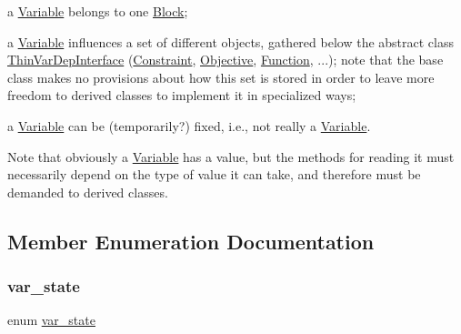 \begin{DoxyItemize}
\item a \mbox{\hyperlink{class_s_m_spp__di__unipi__it_1_1_variable}{Variable}} belongs to one \mbox{\hyperlink{class_s_m_spp__di__unipi__it_1_1_block}{Block}};
\item a \mbox{\hyperlink{class_s_m_spp__di__unipi__it_1_1_variable}{Variable}} influences a set of different objects, gathered below the abstract class \mbox{\hyperlink{class_s_m_spp__di__unipi__it_1_1_thin_var_dep_interface}{Thin\+Var\+Dep\+Interface}} (\mbox{\hyperlink{class_s_m_spp__di__unipi__it_1_1_constraint}{Constraint}}, \mbox{\hyperlink{class_s_m_spp__di__unipi__it_1_1_objective}{Objective}}, \mbox{\hyperlink{class_s_m_spp__di__unipi__it_1_1_function}{Function}}, ...); note that the base class makes no provisions about how this set is stored in order to leave more freedom to derived classes to implement it in specialized ways;
\item a \mbox{\hyperlink{class_s_m_spp__di__unipi__it_1_1_variable}{Variable}} can be (temporarily?) fixed, i.\+e., not really a \mbox{\hyperlink{class_s_m_spp__di__unipi__it_1_1_variable}{Variable}}.
\end{DoxyItemize}

Note that obviously a \mbox{\hyperlink{class_s_m_spp__di__unipi__it_1_1_variable}{Variable}} has a value, but the methods for reading it must necessarily depend on the type of value it can take, and therefore must be demanded to derived classes. 

\subsection{Member Enumeration Documentation}
\mbox{\label{class_s_m_spp__di__unipi__it_1_1_variable_a30febf04ce89c19659143fa83ae6f7ba}} 
\subsubsection{\texorpdfstring{var\+\_\+state}{var\_state}}
{\footnotesize\ttfamily enum \mbox{\hyperlink{class_s_m_spp__di__unipi__it_1_1_variable_a30febf04ce89c19659143fa83ae6f7ba}{var\+\_\+state}}}



